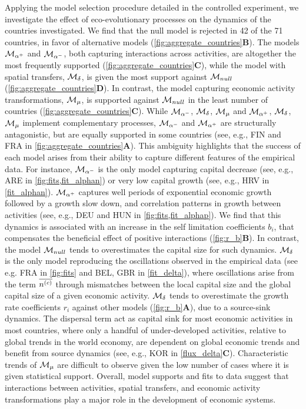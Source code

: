 Applying the model selection procedure detailed in the controlled experiment, we investigate the effect of eco-evolutionary processes on the dynamics of the countries investigated. We find that the null model is rejected in 42 of the 71 countries, in favor of alternative models (\cref{fig:aggregate_countries}\textbf{B}).
% 
The models $\mathcal{M}_{\alpha^+}$ and $\mathcal{M}_{\alpha^-}$, both capturing interactions across activities, are altogether the most frequently supported (\cref{fig:aggregate_countries}\textbf{C}),
%
while the model with spatial transfers, $\mathcal{M}_\delta$, is given the most support against $\mathcal{M}_{null}$ (\cref{fig:aggregate_countries}\textbf{D}).
% 
In contrast, the model capturing economic activity transformations, $\mathcal{M}_\mu$, is supported against $\mathcal{M}_{null}$ in the least number of countries (\cref{fig:aggregate_countries}\textbf{C}).
% 
While $\mathcal{M}_{\alpha^-}$, $\mathcal{M}_\delta$, $\mathcal{M}_\mu$ and $\mathcal{M}_{\alpha^+}$, $\mathcal{M}_\delta$, $\mathcal{M}_\mu$ implement complementary processes, $\mathcal{M}_{\alpha^-}$ and $\mathcal{M}_{\alpha^+}$ are structurally antagonistic, but are equally supported in some countries (see, e.g., FIN and FRA in \cref{fig:aggregate_countries}\textbf{A}). This ambiguity highlights that the success of each model arises from their ability to capture different features of the empirical data.
% 
For instance, $\mathcal{M}_{\alpha^-}$ is the only model capturing capital decrease (see, e.g., ARE in \cref{fig:fits,fit_alphan}) or very low capital growth (see, e.g., HRV in \cref{fit_alphan}).
% 
$\mathcal{M}_{\alpha^+}$  captures well periods of exponential economic growth followed by a growth slow down, and correlation patterns in growth between activities (see, e.g., DEU and HUN in \cref{fig:fits,fit_alphap}). We find that this dynamics is associated with an increase in the self limitation coefficients $b_i$, that compensates the beneficial effect of positive interactions (\cref{fig:r_b}\textbf{B}). In contrast, the model $\mathcal{M}_{null}$ tends to overestimates the capital size for such dynamics.
%
$\mathcal{M}_\delta$ is the only model reproducing the oscillations observed in the empirical data (see e.g. FRA in \cref{fig:fits} and BEL, GBR in \cref{fit_delta}), where oscillations arise from the term $\overline{n^{(c)}}$ through mismatches between the local capital size and the global capital size of a given economic activity. $\mathcal{M}_\delta$ tends to overestimate the growth rate coefficients $r_i$ against other models (\cref{fig:r_b}\textbf{A}), due to a source-sink dynamics. The dispersal term act as capital sink for most economic activities in most countries, where only a handful of under-developed activities, relative to global trends in the world economy, are dependent on global economic trends and benefit from source dynamics (see, e.g., KOR in \cref{flux_delta}\textbf{C}).
% 
Characteristic trends of $\mathcal{M}_\mu$ are difficult to observe given the low number of cases where it is given statistical support. 
% 
Overall, model supports and fits to data suggest that interactions between activities, spatial transfers, and economic activity transformations play a major role in the development of economic systems.

